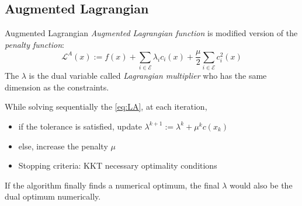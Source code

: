 \documentclass{beamer}
\begin{document}
\subsection{Augmented Lagrangian}
\begin{frame}{Augmented Lagrangian}
\emph{Augmented Lagrangian function} is modified version of the \emph{penalty function}:
\begin{equation}
\label{eq:LA}
\mathcal{L}^A (x):= f(x) + \sum_{i \in \mathcal{E}} \lambda_i c_i(x) +\frac{\mu}{2} \sum_{i \in \mathcal{E}} c_i^2(x)
\end{equation}
The $\lambda$ is the dual variable called \emph{Lagrangian multiplier} who has the same dimension as the constraints.

While solving sequentially the \ref{eq:LA},
at each iteration,
\begin{itemize}
 \item if the tolerance is satisfied,  update $\lambda^{k+1} := \lambda^{k} + \mu^k c(x_k)$
 \item else, increase the penalty $\mu$
 \item Stopping criteria: KKT necessary optimality conditions 
\end{itemize}

If the algorithm finally finds a numerical optimum, the final $\lambda$ would also be the dual optimum numerically.
\end{frame}
\end{document}
